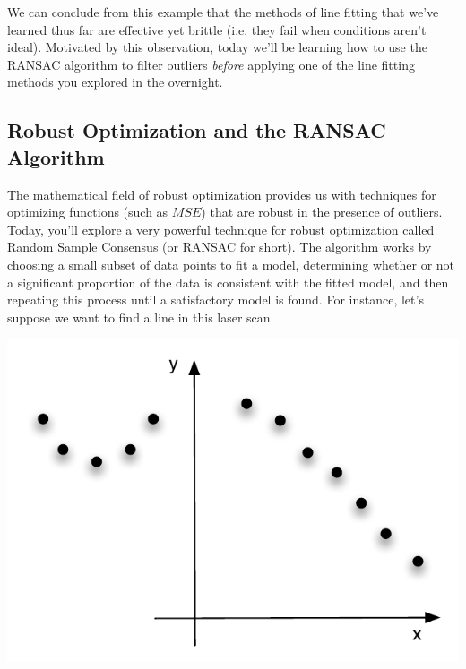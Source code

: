 \documentclass{tufte-handout}
\begin{document}
We can conclude from this example that the methods of line fitting that we've learned thus far are effective yet brittle (i.e. they fail when conditions aren't ideal).  Motivated by this observation, today we'll be learning how to use the RANSAC algorithm to filter outliers \emph{before} applying one of the line fitting methods you explored in the overnight.

\subsection{Robust Optimization and the RANSAC Algorithm}\label{sec:ransac}
The mathematical field of robust optimization provides us with techniques for optimizing functions (such as $MSE$) that are robust in the presence of outliers.  Today, you'll explore a very powerful technique for robust optimization called \href{https://en.wikipedia.org/wiki/Random_sample_consensus}{Random Sample Consensus} (or RANSAC for short).  The algorithm works by choosing a small subset of data points to fit a model, determining whether or not a significant proportion of the data is consistent with the fitted model, and then repeating this process until a satisfactory model is found.  For instance, let's suppose we want to find a line in this laser scan.

\begin{center}
\includegraphics[width=0.6\linewidth]{Figures/mixedscan}
\end{center}
\end{document}
